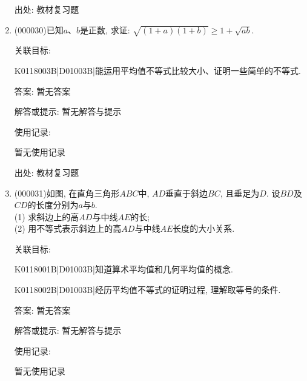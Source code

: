 \documentclass[10pt,a4paper]{article}
\begin{document}
\begin{enumerate}[1.]
出处: 教材复习题
\item { (000030)}已知$a$、$b$是正数, 求证: $\sqrt{(1+a)(1+b)}\ge 1+\sqrt{ab}$.


关联目标:

K0118003B|D01003B|能运用平均值不等式比较大小、证明一些简单的不等式.

答案: 暂无答案

解答或提示: 暂无解答与提示

使用记录:

暂无使用记录


出处: 教材复习题
\item { (000031)}如图, 在直角三角形$ABC$中, $AD$垂直于斜边$BC$, 且垂足为$D$. 设$BD$及$CD$的长度分别为$a$与$b$.\\
(1) 求斜边上的高$AD$与中线$AE$的长;\\
(2) 用不等式表示斜边上的高$AD$与中线$AE$长度的大小关系.
\begin{center}
\end{center}


关联目标:

K0118001B|D01003B|知道算术平均值和几何平均值的概念.

K0118002B|D01003B|经历平均值不等式的证明过程, 理解取等号的条件.

答案: 暂无答案

解答或提示: 暂无解答与提示

使用记录:

暂无使用记录



\end{enumerate}
\end{document}
